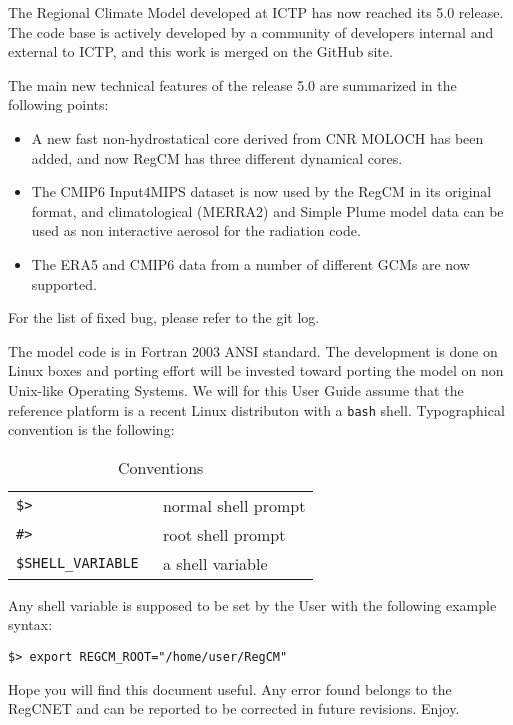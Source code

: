 
The Regional Climate Model developed at ICTP has now reached its 5.0 release.
The code base is actively developed by a community of developers internal and
external to ICTP, and this work is merged on the GitHub site.

The main new technical features of the release 5.0 are summarized in the
following points:

\begin{itemize}
  \item A new fast non-hydrostatical core derived from CNR MOLOCH has
      been added, and now RegCM has three different dynamical cores.
  \item The CMIP6 Input4MIPS dataset is now used by the RegCM in its
      original format, and climatological (MERRA2) and Simple Plume model
      data can be used as non interactive aerosol for the radiation code.
  \item The ERA5 and CMIP6 data from a number of different GCMs are now
      supported.
\end{itemize}
For the list of fixed bug, please refer to the git log.

The model code is in Fortran 2003 ANSI standard.
The development is done on Linux boxes and porting effort will be invested
toward porting the model on non Unix-like Operating Systems.
We will for this User Guide assume that the reference platform is a recent
Linux distributon with a \verb=bash= shell.
Typographical convention is the following:

\begin{table}[ht]
\caption{Conventions}
\vspace{0.05 in}
\centering
\begin{tabular}{l|l}
\hline
\verb=$> = & normal shell prompt \\
\verb=#> = & root shell prompt \\
\verb=$SHELL_VARIABLE = & a shell variable \\
\hline
\end{tabular}
\label{conventions}
\end{table}

Any shell variable is supposed to be set by the User with the following example
syntax:

\begin{Verbatim}
$> export REGCM_ROOT="/home/user/RegCM"
\end{Verbatim}

Hope you will find this document useful. Any error found belongs to the
RegCNET and can be reported to be corrected in future revisions. Enjoy.
